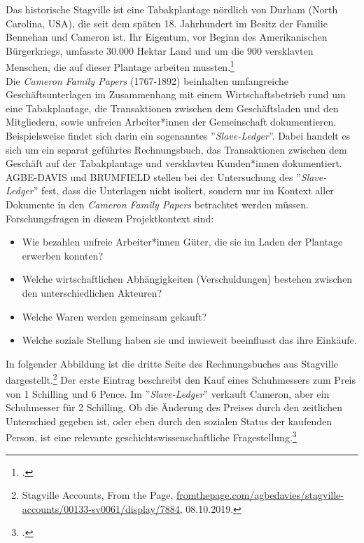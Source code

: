\documentclass[12pt,a4paper]{article}
\begin{document}
Das historische Stagville ist eine Tabakplantage nördlich von Durham (North Carolina, USA), die seit dem späten 18. Jahrhundert im Besitz der Familie Bennehan und Cameron ist. Ihr Eigentum, vor Beginn des Amerikanischen Bürgerkriegs, umfasste 30.000 Hektar Land und um die 900 versklavten Menschen, die auf dieser Plantage arbeiten mussten.\footcite[][]{brumfield2015medea}
\\
Die \textit{Cameron Family Papers} (1767-1892) beinhalten umfangreiche Geschäftsunterlagen im Zusammenhang mit einem Wirtschaftsbetrieb rund um eine Tabakplantage, die Transaktionen zwischen dem Geschäftsladen und den Mitgliedern, sowie unfreien Arbeiter*innen der Gemeinschaft dokumentieren. Beispielsweise findet sich darin ein sogenanntes ''\textit{Slave-Ledger}''. Dabei handelt es sich um ein separat geführtes Rechnungsbuch, das Transaktionen zwischen dem Geschäft auf der Tabakplantage und versklavten Kunden*innen dokumentiert.
\\
AGBE-DAVIS und BRUMFIELD stellen bei der Untersuchung des ''\textit{Slave-Ledger}'' fest, dass die Unterlagen nicht isoliert, sondern nur im Kontext aller Dokumente in den \textit{Cameron Family Papers} betrachtet werden müssen. Forschungsfragen in diesem Projektkontext sind:
\begin{itemize}
\item Wie bezahlen unfreie Arbeiter*innen Güter, die sie im Laden der Plantage erwerben konnten?
\item Welche wirtschaftlichen Abhängigkeiten (Verschuldungen) bestehen zwischen den unterschiedlichen Akteuren?
\item Welche Waren werden gemeinsam gekauft?
\item Welche soziale Stellung haben sie und inwieweit beeinflusst das ihre Einkäufe.
\end{itemize}
In folgender Abbildung ist die dritte Seite des Rechnungsbuches aus Stagville dargestellt.\footnote{Stagville Accounts, From the Page, \protect\url{fromthepage.com/agbedavies/stagville-accounts/00133-sv0061/display/7884}, 08.10.2019.} Der erste Eintrag beschreibt den Kauf eines Schuhmessers zum Preis von 1 Schilling und 6 Pence. Im ''\textit{Slave-Ledger}'' verkauft Cameron, aber ein Schuhmesser für 2 Schilling. Ob die Änderung des Preises durch den zeitlichen Unterschied gegeben ist, oder eben durch den sozialen Status der kaufenden Person, ist eine relevante geschichtswissenschaftliche Fragestellung.\footcite[][]{brumfield2019blog}
\end{document}
